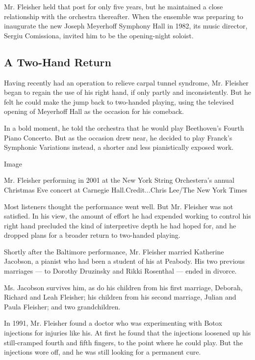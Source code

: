 Mr. Fleisher held that post for only five years, but he maintained a
close relationship with the orchestra thereafter. When the ensemble was
preparing to inaugurate the new Joseph Meyerhoff Symphony Hall in 1982,
its music director, Sergiu Comissiona, invited him to be the
opening-night soloist.

\hypertarget{a-two-hand-return}{%
\subsection{A Two-Hand Return}\label{a-two-hand-return}}

Having recently had an operation to relieve carpal tunnel syndrome, Mr.
Fleisher began to regain the use of his right hand, if only partly and
inconsistently. But he felt he could make the jump back to two-handed
playing, using the televised opening of Meyerhoff Hall as the occasion
for his comeback.

In a bold moment, he told the orchestra that he would play Beethoven's
Fourth Piano Concerto. But as the occasion drew near, he decided to play
Franck's Symphonic Variations instead, a shorter and less pianistically
exposed work.

Image

Mr. Fleisher performing in 2001 at the New York String Orchestera's
annual~ Christmas Eve concert at Carnegie Hall.Credit...Chris Lee/The
New York Times

Most listeners thought the performance went well. But Mr. Fleisher was
not satisfied. In his view, the amount of effort he had expended working
to control his right hand precluded the kind of interpretive depth he
had hoped for, and he dropped plans for a broader return to two-handed
playing.

Shortly after the Baltimore performance, Mr. Fleisher married Katherine
Jacobson, a pianist who had been a student of his at Peabody. His two
previous marriages --- to Dorothy Druzinsky and Rikki Rosenthal ---
ended in divorce.

Ms. Jacobson survives him, as do his children from his first marriage,
Deborah, Richard and Leah Fleisher; his children from his second
marriage, Julian and Paula Fleisher; and two grandchildren.

In 1991, Mr. Fleisher found a doctor who was experimenting with Botox
injections for injuries like his. At first he found that the injections
loosened up his still-cramped fourth and fifth fingers, to the point
where he could play. But the injections wore off, and he was still
looking for a permanent cure.


